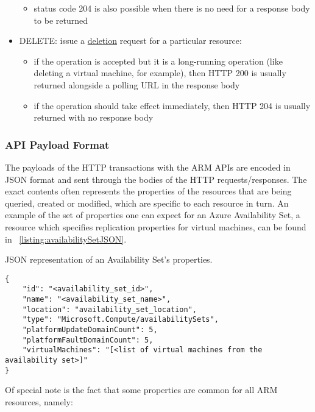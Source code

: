 \documentclass[11pt]{report}
\begin{document}
\begin{itemize}
\begin{itemize}
            \item{} status code 204 is also possible when there is no need for
                a response body to be returned
        \end{itemize}
    \item{DELETE}: issue a \ul{deletion} request for a particular resource:
        \begin{itemize}
            \item{} if the operation is accepted but it is a long-running
                operation (like deleting a virtual machine, for example), then
                HTTP 200 is usually returned alongside a polling URL in the
                response body
            \item{} if the operation should take effect immediately, then HTTP
                204 is usually returned with no response body
        \end{itemize}
\end{itemize}

\subsubsection{API Payload Format}

The payloads of the HTTP transactions with the ARM APIs are encoded in JSON
format and sent through the bodies of the HTTP requests/responses. The exact
contents often represents the properties of the resources that are being
queried, created or modified, which are specific to each resource in turn.
An example of the set of properties one can expect for an Azure
Availability Set, a resource which specifies replication properties for virtual
machines, can be found in ~\ref{listing:availabilitySetJSON}.

\begin{listing}[H]
\caption{JSON representation of an Availability Set's properties.}
\label{listing:availabilitySetJSON}
\begin{verbatim}
{
    "id": "<availability_set_id>",
    "name": "<availability_set_name>",
    "location": "availability_set_location",
    "type": "Microsoft.Compute/availabilitySets",
    "platformUpdateDomainCount": 5,
    "platformFaultDomainCount": 5,
    "virtualMachines": "[<list of virtual machines from the availability set>]"
}
\end{verbatim}
\end{listing}

Of special note is the fact that some properties are common for all ARM
resources, namely:
\end{document}
